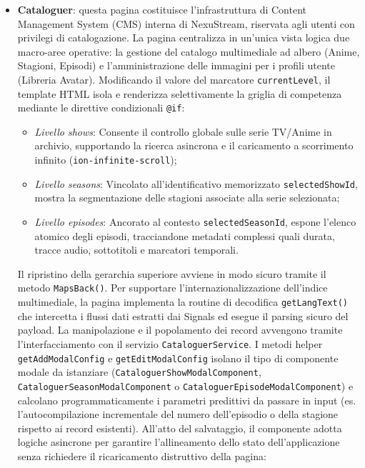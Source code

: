 \documentclass[11pt,a4paper]{article}
\begin{document}
\begin{itemize}
    Il template elabora la matrice dati attraverso la direttiva accoppiata \texttt{@for}, mappando le card dei profili con classi stilistiche differenziate (es. \texttt{.edge-admin}) qualora il soggetto esaminato detenga poteri di amministrazione stabili. La classificazione funzionale dell'utente viene esplicitata visivamente attraverso un sistema di badge condizionali annidati, i quali valutano a runtime i flag booleani restituiti dal record.
    \item \textbf{Cataloguer}: questa pagina costituisce l'infrastruttura di Content Management System (CMS) interna di NexuStream, riservata agli utenti con privilegi di catalogazione. La pagina centralizza in un'unica vista logica due macro-aree operative: la gestione del catalogo multimediale ad albero (Anime, Stagioni, Episodi) e l'amministrazione delle immagini per i profili utente (Libreria Avatar). Modificando il valore del marcatore \texttt{currentLevel}, il template HTML isola e renderizza selettivamente la griglia di competenza mediante le direttive condizionali \texttt{@if}: 
    \begin{itemize}
        \item \textit{Livello shows}: Consente il controllo globale sulle serie TV/Anime in archivio, supportando la ricerca asincrona e il caricamento a scorrimento infinito (\texttt{ion-infinite-scroll});
        \item \textit{Livello seasons}: Vincolato all'identificativo memorizzato \texttt{selectedShowId}, mostra la segmentazione delle stagioni associate alla serie selezionata;
        \item \textit{Livello episodes}: Ancorato al contesto \texttt{selectedSeasonId}, espone l'elenco atomico degli episodi, tracciandone metadati complessi quali durata, tracce audio, sottotitoli e marcatori temporali.
    \end{itemize}
    Il ripristino della gerarchia superiore avviene in modo sicuro tramite il metodo \texttt{MapsBack()}. Per supportare l'internazionalizzazione dell'indice multimediale, la pagina implementa la routine di decodifica \texttt{getLangText()} che intercetta i flussi dati estratti dai Signals ed esegue il parsing sicuro del payload. La manipolazione e il popolamento dei record avvengono tramite l'interfacciamento con il servizio \texttt{CataloguerService}. I metodi helper \texttt{getAddModalConfig} e \texttt{getEditModalConfig} isolano il tipo di componente modale da istanziare (\texttt{CataloguerShowModalComponent}, \texttt{CataloguerSeasonModalComponent} o \texttt{CataloguerEpisodeModalComponent}) e calcolano programmaticamente i parametri predittivi da passare in input (es. l'autocompilazione incrementale del numero dell'episodio o della stagione rispetto ai record esistenti). All'atto del salvataggio, il componente adotta logiche asincrone per garantire l'allineamento dello stato dell'applicazione senza richiedere il ricaricamento distruttivo della pagina:

\end{itemize}
\end{document}
